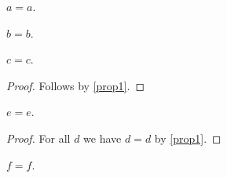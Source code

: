 \begin{proposition}\label{prop1}
    $a = a$.
\end{proposition}

\begin{proposition}\label{prop2}
    $b = b$.
\end{proposition}

\begin{proposition}\label{prop3}
    $c = c$.
\end{proposition}
\begin{proof}
    Follows by \ref{prop1}. %
\end{proof}

\begin{proposition}\label{prop4}
    $e = e$.
\end{proposition}
\begin{proof}
    For all $d$ we have $d = d$ by \ref{prop1}.
\end{proof}

\begin{proposition}\label{prop5}
    $f = f$.
\end{proposition}

